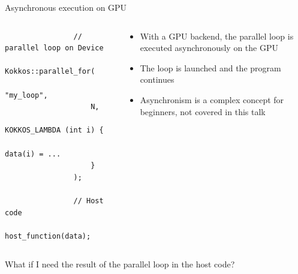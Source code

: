\documentclass[
    aspectratio=169,
]{beamer}
\begin{document}

\begin{frame}[fragile]{Asynchronous execution on GPU}
    \begin{columns}
        \begin{column}{0.5\linewidth}
            \begin{verbatim}
                // parallel loop on Device
                Kokkos::parallel_for(
                    "my_loop",
                    N,
                    KOKKOS_LAMBDA (int i) {
                        data(i) = ...
                    }
                );

                // Host code
                host_function(data);
            \end{verbatim}
        \end{column}
        \begin{column}{0.5\linewidth}
            \begin{itemize}
                \item With a GPU backend, the parallel loop is executed asynchronously on the GPU
                \item The loop is launched and the program continues
                \item Asynchronism is a complex concept for beginners, not covered in this talk
            \end{itemize}
        \end{column}
    \end{columns}

    \pause

    \vspace{1em}
     What if I need the result of the parallel loop in the host code?
\end{frame}

\end{document}
